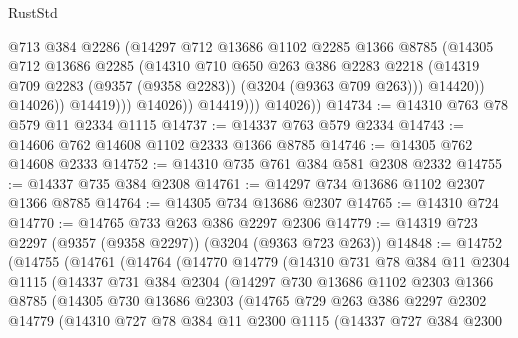 \begin{lexlean}{RustStd}
\begin{coremodule}
                          @713
                          @384
                          @2286
                          (@14297
                            @712
                            @13686
                            @1102
                            @2285
                            @1366
                            @8785
                            (@14305
                              @712
                              @13686
                              @2285
                              (@14310
                                @710
                                @650
                                @263
                                @386
                                @2283
                                @2218
                                (@14319 @709 @2283 (@9357 (@9358 @2283)) (@3204 (@9363 @709 @263)))
                                @14420))
                            @14026))
                        @14419)))
                  @14026))
              @14419)))
        @14026))
@14734 := @14310 @763 @78 @579 @11 @2334 @1115
@14737 := @14337 @763 @579 @2334
@14743 := @14606 @762 @14608 @1102 @2333 @1366 @8785
@14746 := @14305 @762 @14608 @2333
@14752 := @14310 @735 @761 @384 @581 @2308 @2332
@14755 := @14337 @735 @384 @2308
@14761 := @14297 @734 @13686 @1102 @2307 @1366 @8785
@14764 := @14305 @734 @13686 @2307
@14765 := @14310 @724
@14770 := @14765 @733 @263 @386 @2297 @2306
@14779 := @14319 @723 @2297 (@9357 (@9358 @2297)) (@3204 (@9363 @723 @263))
@14848 := @14752
    (@14755
      (@14761
        (@14764
          (@14770
            @14779
            (@14310
              @731
              @78
              @384
              @11
              @2304
              @1115
              (@14337
                @731
                @384
                @2304
                (@14297
                  @730
                  @13686
                  @1102
                  @2303
                  @1366
                  @8785
                  (@14305
                    @730
                    @13686
                    @2303
                    (@14765
                      @729
                      @263
                      @386
                      @2297
                      @2302
                      @14779
                      (@14310
                        @727
                        @78
                        @384
                        @11
                        @2300
                        @1115
                        (@14337
                          @727
                          @384
                          @2300

\end{coremodule}
\end{lexlean}
